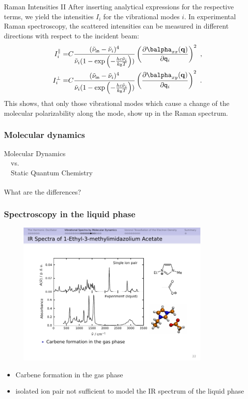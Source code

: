 \documentclass[t]{beamer}
\newcommand{\boltz}{k_{\mathsf{B}}}             %
\begin{document}
	\begin{frame}{Raman Intensities II}
	    After inserting analytical expressions for the respective terms, we yield the intensities $I_i$ for the vibrational modes $i$. In experimental Raman spectroscopy, the scattered intensities can be measured in different directions with respect to the incident beam:
	    \begin{align*}
	        I_i^\parallel = & C \frac{(\tilde{\nu}_\mathsf{in} - \tilde{\nu}_i)^4}{\tilde{\nu}_i (1- \exp\left(-\frac{hc\tilde{\nu}_i}{\boltz T}\right))} \left( \frac{\partial\balpha_{xx}(\mathbf{q})}{\partial \mathsf{q}_i} \right)^2~,  \\
	        I_i^\perp = & C \frac{(\tilde{\nu}_\mathsf{in} - \tilde{\nu}_i)^4}{\tilde{\nu}_i (1- \exp\left(-\frac{hc\tilde{\nu}_i}{\boltz T}\right))} \left( \frac{\partial\balpha_{xy}(\mathbf{q})}{\partial \mathsf{q}_i} \right)^2~.
	    \end{align*}
	    This shows, that only those vibrational modes which cause a change of the molecular polarizability along the mode, show up in the Raman spectrum.
	\end{frame}
	\begin{frame}[plain,c]
	    \frametitle{Molecular dynamics}
	    \centering \Large
	    Molecular Dynamics \\~\ vs. \\~\ Static Quantum Chemistry \\~\\
	    What are the differences?
	\end{frame}
	\begin{frame}
	    \frametitle{Spectroscopy in the liquid phase}
	    \begin{figure}
            \includegraphics[width=0.85\textwidth]{figures/emimoac_ir.pdf}
        \end{figure}
        \pause
        \begin{itemize}
            \item Carbene formation in the gas phase
            \item isolated ion pair not sufficient to model the IR spectrum of the liquid phase
        \end{itemize}
	\end{frame}
\end{document}
